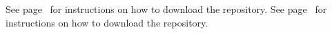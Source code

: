See page~\pageref{code} for instructions on how to download the repository.
See page~\pageref{page} for instructions on how to download the repository.
